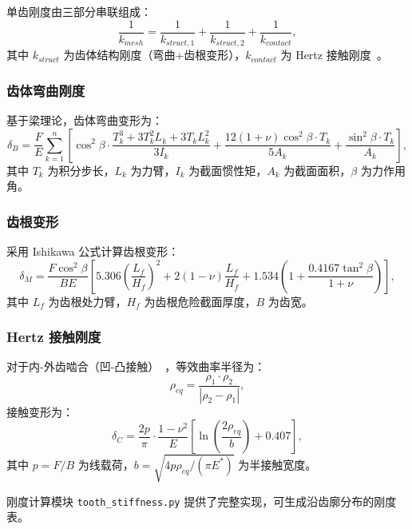 \documentclass[12pt]{ctexart}
\begin{document}
单齿刚度由三部分串联组成：
\begin{equation}
\frac{1}{k_{mesh}} = \frac{1}{k_{struct,1}} + \frac{1}{k_{struct,2}} + \frac{1}{k_{contact}},
\end{equation}
其中 $k_{struct}$ 为齿体结构刚度（弯曲+齿根变形），$k_{contact}$ 为 Hertz 接触刚度~\cite{johnson}。

\subsubsection{齿体弯曲刚度}

基于梁理论，齿体弯曲变形为：
\begin{equation}
\delta_B = \frac{F}{E} \sum_{k=1}^{n} \left[ \cos^2\beta \cdot \frac{T_k^3 + 3T_k^2 L_k + 3T_k L_k^2}{3I_k} + \frac{12(1+\nu)\cos^2\beta \cdot T_k}{5A_k} + \frac{\sin^2\beta \cdot T_k}{A_k} \right],
\end{equation}
其中 $T_k$ 为积分步长，$L_k$ 为力臂，$I_k$ 为截面惯性矩，$A_k$ 为截面面积，$\beta$ 为力作用角。

\subsubsection{齿根变形}

采用 Ishikawa 公式计算齿根变形：
\begin{equation}
\delta_M = \frac{F\cos^2\beta}{BE} \left[ 5.306\left(\frac{L_f}{H_f}\right)^2 + 2(1-\nu)\frac{L_f}{H_f} + 1.534\left(1 + \frac{0.4167\tan^2\beta}{1+\nu}\right) \right],
\end{equation}
其中 $L_f$ 为齿根处力臂，$H_f$ 为齿根危险截面厚度，$B$ 为齿宽。

\subsubsection{Hertz 接触刚度}

对于内-外齿啮合（凹-凸接触）~\cite{johnson}，等效曲率半径为：
\begin{equation}
\rho_{eq} = \frac{\rho_1 \cdot \rho_2}{|\rho_2 - \rho_1|},
\end{equation}
接触变形为：
\begin{equation}
\delta_C = \frac{2p}{\pi} \cdot \frac{1-\nu^2}{E} \left[ \ln\left(\frac{2\rho_{eq}}{b}\right) + 0.407 \right],
\end{equation}
其中 $p = F/B$ 为线载荷，$b = \sqrt{4p\rho_{eq}/(\pi E^*)}$ 为半接触宽度。

刚度计算模块 \texttt{tooth\_stiffness.py} 提供了完整实现，可生成沿齿廓分布的刚度表。
\end{document}
